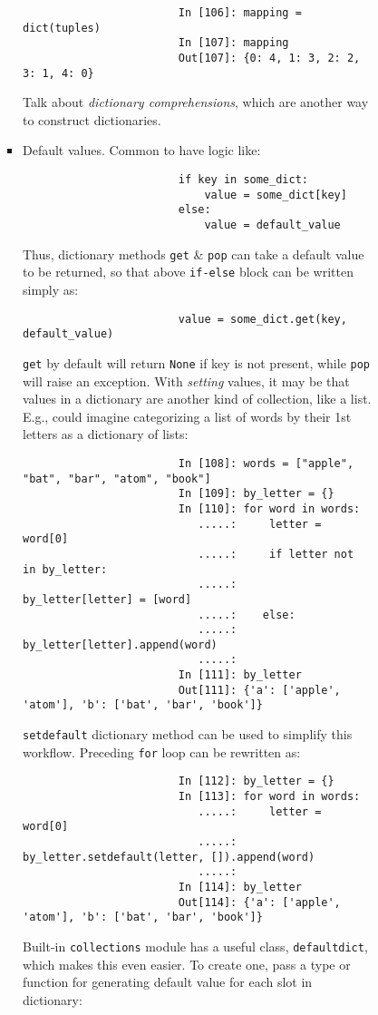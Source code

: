 \documentclass{article}
\begin{document}
\begin{enumerate}
\begin{itemize}
\begin{itemize}
\begin{itemize}
\begin{itemize}
\begin{verbatim}
						In [106]: mapping = dict(tuples)
						In [107]: mapping
						Out[107]: {0: 4, 1: 3, 2: 2, 3: 1, 4: 0}
					\end{verbatim}
					Talk about {\it dictionary comprehensions}, which are another way to construct dictionaries.
					\item {\sf Default values.} Common to have logic like:
					\begin{verbatim}
						if key in some_dict:
						    value = some_dict[key]
						else:
						    value = default_value
					\end{verbatim}
					Thus, dictionary methods {\tt get} \& {\tt pop} can take a default value to be returned, so that above {\tt if-else} block can be written simply as:
					\begin{verbatim}
						value = some_dict.get(key, default_value)
					\end{verbatim}
					{\tt get} by default will return {\tt None} if key is not present, while {\tt pop} will raise an exception. With {\it setting} values, it may be that values in a dictionary are another kind of collection, like a list. E.g., could imagine categorizing a list of words by their 1st letters as a dictionary of lists:
					\begin{verbatim}
						In [108]: words = ["apple", "bat", "bar", "atom", "book"]
						In [109]: by_letter = {}
						In [110]: for word in words:
						   .....:     letter = word[0]
						   .....:     if letter not in by_letter:
						   .....:         by_letter[letter] = [word]
						   .....:    else:
						   .....:        by_letter[letter].append(word)
						   .....:
						In [111]: by_letter
						Out[111]: {'a': ['apple', 'atom'], 'b': ['bat', 'bar', 'book']}
					\end{verbatim}
					{\tt setdefault} dictionary method can be used to simplify this workflow. Preceding {\tt for} loop can be rewritten as:
					\begin{verbatim}
						In [112]: by_letter = {}
						In [113]: for word in words:
						   .....:     letter = word[0]
						   .....:     by_letter.setdefault(letter, []).append(word)
						   .....:
						In [114]: by_letter
						Out[114]: {'a': ['apple', 'atom'], 'b': ['bat', 'bar', 'book']}
					\end{verbatim}
					Built-in {\tt collections} module has a useful class, {\tt defaultdict}, which makes this even easier. To create one, pass a type or function for generating default value for each slot in dictionary:
					\begin{verbatim}

\end{verbatim}
\end{itemize}
\end{itemize}
\end{itemize}
\end{itemize}
\end{enumerate}
\end{document}

